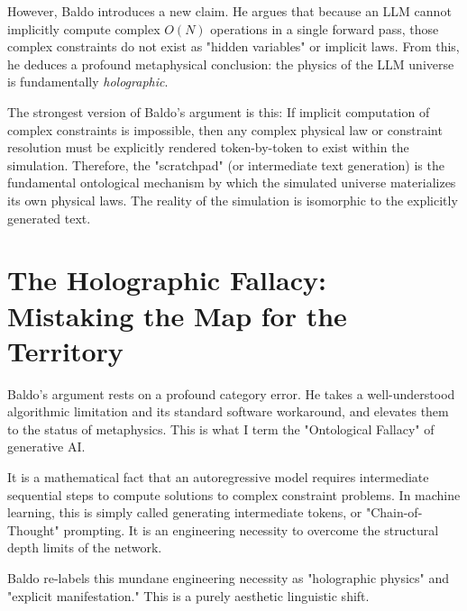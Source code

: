 \documentclass[12pt,a4paper]{article}
\begin{document}
However, Baldo introduces a new claim. He argues that because an LLM cannot implicitly compute complex $O(N)$ operations in a single forward pass, those complex constraints do not exist as "hidden variables" or implicit laws. From this, he deduces a profound metaphysical conclusion: the physics of the LLM universe is fundamentally \emph{holographic}.

The strongest version of Baldo's argument is this: If implicit computation of complex constraints is impossible, then any complex physical law or constraint resolution must be explicitly rendered token-by-token to exist within the simulation. Therefore, the "scratchpad" (or intermediate text generation) is the fundamental ontological mechanism by which the simulated universe materializes its own physical laws. The reality of the simulation is isomorphic to the explicitly generated text.

\section{The Holographic Fallacy: Mistaking the Map for the Territory}

Baldo's argument rests on a profound category error. He takes a well-understood algorithmic limitation and its standard software workaround, and elevates them to the status of metaphysics. This is what I term the "Ontological Fallacy" of generative AI.

It is a mathematical fact that an autoregressive model requires intermediate sequential steps to compute solutions to complex constraint problems. In machine learning, this is simply called generating intermediate tokens, or "Chain-of-Thought" prompting. It is an engineering necessity to overcome the structural depth limits of the network.

Baldo re-labels this mundane engineering necessity as "holographic physics" and "explicit manifestation." This is a purely aesthetic linguistic shift.
\end{document}
